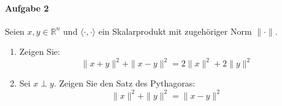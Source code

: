 \documentclass{scrartcl}
\begin{document}
	\paragraph{Aufgabe 2}
	Seien $x,y\in\mathbb{R}^n$ und $\langle\cdot,\cdot\rangle$
	ein Skalarprodukt mit zugehöriger Norm $\|\cdot\|$.
	\begin{enumerate}[label=(\alph*)]
		\item Zeigen Sie:
			\[\|x+y\|^2+\|x-y\|^2=2\|x\|^2+2\|y\|^2\]
		\item Sei $x\perp y$. Zeigen Sie den Satz des Pythagoras:
			\[\|x\|^2+\|y\|^2=\|x-y\|^2\]
	\end{enumerate}
\end{document}
